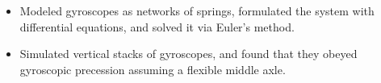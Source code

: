 

\begin{itemize}[nosep]
  \item Modeled gyroscopes as networks of springs, formulated the system with differential equations, and solved it via Euler's method.
  \item Simulated vertical stacks of gyroscopes, and found that they obeyed gyroscopic precession assuming a flexible middle axle.
\end{itemize}
